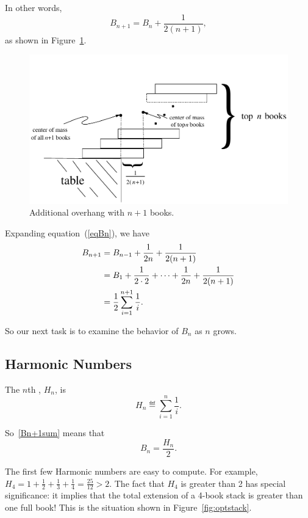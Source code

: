 In other words, 
\begin{equation}\label{eqBn}
    B_{n+1} = B_n + \frac{1}{2(n+1)},
\end{equation}
as shown in Figure~\ref{Bn1}.

\begin{figure}
\centerline{\includegraphics[width=.80\textwidth]{figures/drafts/bookstack-5}}
\caption{Additional overhang with $n+1$ books.}
\label{Bn1}
\end{figure}

Expanding equation~(\ref{eqBn}), we have
\begin{align}
B_{n+1} & = B_{n-1} + \frac{1}{2n} + \frac{1}{2(n+1)}\notag\\
        & = B_1 + \frac{1}{2 \cdot 2} + \cdots + \frac{1}{2n} +
            \frac{1}{2(n+1)}\notag\\
        & = \frac{1}{2}\sum_{i=1}^{n+1} \frac{1}{i}.\label{Bn+1sum}
\end{align}

So our next task is to examine the behavior of $B_n$ as $n$ grows.

\subsection{Harmonic Numbers}

\begin{definition}
The $n$th , $H_n$, is
\[
H_n \eqdef \sum_{i=1}^n \frac{1}{i}.
\]
\end{definition}
So~\eqref{Bn+1sum} means that
\[
B_n = \frac{H_n}{2}.
\]

The first few Harmonic numbers are easy to compute.  For example, $H_4 = 1
+ \frac{1}{2} + \frac{1}{3} + \frac{1}{4} = \frac{25}{12} > 2$.  The fact that
$H_4$ is greater than 2 has special significance: it implies that the
total extension of a 4-book stack is greater than one full book!  This is
the situation shown in Figure~\ref{fig:optstack}.

